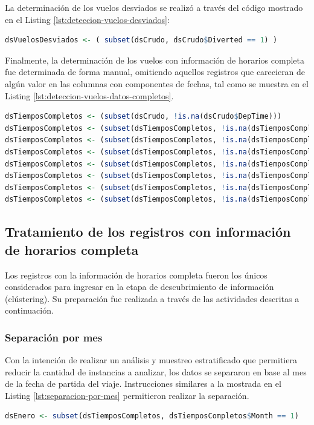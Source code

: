 \documentclass[12pt]{article}
\numberwithin{equation}{section}
\numberwithin{table}{section}
\numberwithin{figure}{section}
\begin{document}
La determinación de los vuelos desviados se realizó a través del código mostrado en el Listing \ref{lst:deteccion-vuelos-desviados}:
\begin{lstlisting}[language=R, caption=Detección de vuelos desviados, label={lst:deteccion-vuelos-desviados}]
dsVuelosDesviados <- ( subset(dsCrudo, dsCrudo$Diverted == 1) )
\end{lstlisting}

Finalmente, la determinación de los vuelos con información de horarios completa fue determinada de forma manual, omitiendo aquellos registros que carecieran de algún valor en las columnas con componentes de fechas, tal como se muestra en el Listing \ref{lst:deteccion-vuelos-datos-completos}.
\begin{lstlisting}[language=R, caption=Detección de vuelos con información de horarios completa, label={lst:deteccion-vuelos-datos-completos}]
dsTiemposCompletos <- (subset(dsCrudo, !is.na(dsCrudo$DepTime)))
dsTiemposCompletos <- (subset(dsTiemposCompletos, !is.na(dsTiemposCompletos$ArrTime)))
dsTiemposCompletos <- (subset(dsTiemposCompletos, !is.na(dsTiemposCompletos$CRSArrTime)))
dsTiemposCompletos <- (subset(dsTiemposCompletos, !is.na(dsTiemposCompletos$CRSDepTime)))
dsTiemposCompletos <- (subset(dsTiemposCompletos, !is.na(dsTiemposCompletos$ActualElapsedTime)))
dsTiemposCompletos <- (subset(dsTiemposCompletos, !is.na(dsTiemposCompletos$AirTime)))
dsTiemposCompletos <- (subset(dsTiemposCompletos, !is.na(dsTiemposCompletos$DepDelay)))
dsTiemposCompletos <- (subset(dsTiemposCompletos, !is.na(dsTiemposCompletos$ArrDelay)))
\end{lstlisting}

\subsection{Tratamiento de los registros con información de horarios completa}
Los registros con la información de horarios completa fueron los únicos considerados para ingresar en la etapa de descubrimiento de información (clústering). Su preparación fue realizada a través de las actividades descritas a continuación.

\subsubsection{Separación por mes}
Con la intención de realizar un análisis y muestreo estratificado que permitiera reducir la cantidad de instancias a analizar, los datos se separaron en base al mes de la fecha de partida del viaje.
Instrucciones similares a la mostrada en el Listing \ref{lst:separacion-por-mes} permitieron realizar la separación.
\begin{lstlisting}[language=R, caption=Separación de registros de vuelos por mes, label={lst:separacion-por-mes}]
dsEnero <- subset(dsTiemposCompletos, dsTiemposCompletos$Month == 1)
\end{lstlisting}
\end{document}
